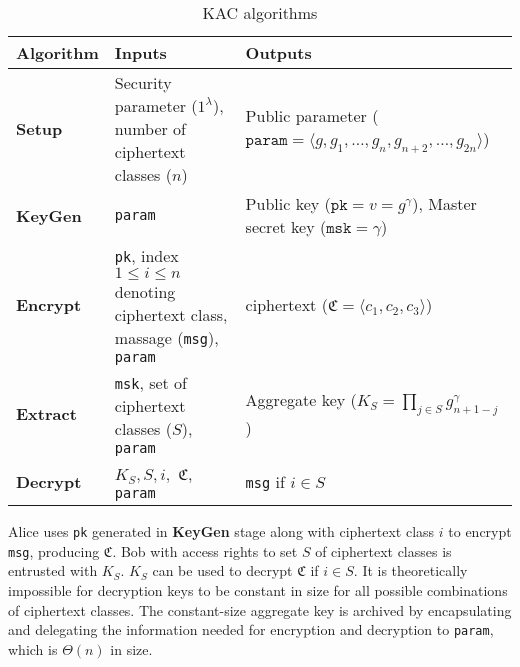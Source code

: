 \documentclass[hyp,a4paper,12pt,openbib]{socreport}
\begin{document}
\begin{table}[h]
\begin{tabular}{|l|p{}|p{}|}
\hline
\textbf{Algorithm} & \textbf{Inputs}                                                                                        & \textbf{Outputs}                                                                                 \\ \hline
\textbf{Setup}              & Security parameter ($1^{\lambda}$), number of ciphertext classes ($n$)                                 & Public parameter ($\texttt{param} = \langle g, g_1, \dots , g_n,g_{n+2}, \dots, g_{2n} \rangle$) \\ \hline
\textbf{KeyGen}             & \texttt{param}                                                                                         & Public key ($\texttt{pk} = v = g^\gamma$), Master secret key ($\texttt{msk} = \gamma$)                                                           \\ \hline
\textbf{Encrypt}            & \texttt{pk}, index $1 \leq i \leq n$ denoting ciphertext class, massage (\texttt{msg}), \texttt{param} & ciphertext ($\mathfrak{C} = \langle c_1, c_2, c_3 \rangle$)                                                                         \\ \hline
\textbf{Extract}            & \texttt{msk}, set of ciphertext classes ($S$), \texttt{param}                                          & Aggregate key ($\displaystyle  K_S = \prod_{j \in S} g^{\gamma}_{n+1-j}$)                        \\ \hline
\textbf{Decrypt}            & $K_S, S, i,$ $\mathfrak{C}$, \texttt{param}                                                               & \texttt{msg} if $i \in S$                                                                        \\ \hline
\end{tabular}

\caption{KAC algorithms}
\label{tab:kac-algo}
\end{table}


Alice uses \texttt{pk} generated in \textbf{KeyGen} stage along with ciphertext class $i$ to encrypt \texttt{msg}, producing $\mathfrak{C}$. Bob with access rights to set $S$ of ciphertext classes is entrusted with $K_S$.  $K_S$ can be used to decrypt $\mathfrak{C}$ if $i \in S$.  It is theoretically impossible for decryption keys to be constant in size for all possible combinations of ciphertext classes. The constant-size aggregate key is archived by encapsulating and delegating the information needed for encryption and decryption to \texttt{param}, which is $\Theta(n)$ in size.
\end{document}
